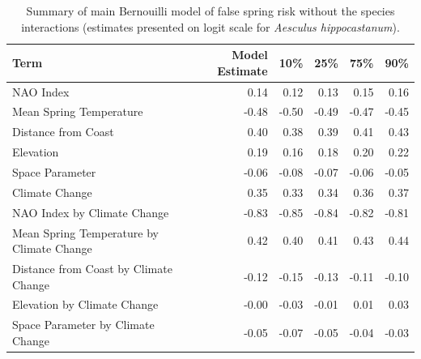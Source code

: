 \documentclass{article}\usepackage[]{graphicx}\usepackage[]{color}
\begin{document}
{%
\begin{table}[H]
\centering
\caption{Summary of main Bernouilli model of false spring risk without the species interactions (estimates presented on logit scale for \textit{Aesculus hippocastanum}).} 
\begin{tabular}{lrrrrr}
  \hline
Term & Model Estimate & 10\% & 25\% & 75\% & 90\% \\ 
  \hline
NAO Index & 0.14 & 0.12 & 0.13 & 0.15 & 0.16 \\ 
  Mean Spring 
Temperature & -0.48 & -0.50 & -0.49 & -0.47 & -0.45 \\ 
  Distance from 
Coast & 0.40 & 0.38 & 0.39 & 0.41 & 0.43 \\ 
  Elevation & 0.19 & 0.16 & 0.18 & 0.20 & 0.22 \\ 
  Space Parameter & -0.06 & -0.08 & -0.07 & -0.06 & -0.05 \\ 
  Climate Change & 0.35 & 0.33 & 0.34 & 0.36 & 0.37 \\ 
  NAO Index by Climate Change & -0.83 & -0.85 & -0.84 & -0.82 & -0.81 \\ 
  Mean Spring 
Temperature by Climate Change & 0.42 & 0.40 & 0.41 & 0.43 & 0.44 \\ 
  Distance from 
Coast by Climate Change & -0.12 & -0.15 & -0.13 & -0.11 & -0.10 \\ 
  Elevation by Climate Change & -0.00 & -0.03 & -0.01 & 0.01 & 0.03 \\ 
  Space Parameter by Climate Change & -0.05 & -0.07 & -0.05 & -0.04 & -0.03 \\ 
   \hline
\end{tabular}
\end{table}



}
\end{document}
